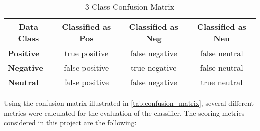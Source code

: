 \begin{table}[H]
\centering
\caption{3-Class Confusion Matrix}
\label{tab:confusion_matrix}
\begin{tabular}{|l|c|c|c|}
\hline
\multicolumn{1}{|c|}{{\color[HTML]{000000} \textbf{Data Class}}} & {\color[HTML]{000000} \textbf{Classified as Pos}} & \textbf{Classified as Neg} & \textbf{Classified as Neu} \\ \hline
{\color[HTML]{000000} \textbf{Positive}}                         & {\color[HTML]{036400} true positive}              & false negative             & false neutral              \\ \hline
\textbf{Negative}                                                & false positive                                    & {\color[HTML]{036400} true negative}              & false neutral              \\ \hline
\textbf{Neutral}                                                 & false positive                                    & false negative             & {\color[HTML]{036400} true neutral}               \\ \hline
\end{tabular}
\end{table}

Using the confusion matrix illustrated in \autoref{tab:confusion_matrix}, several different metrics were calculated for the evaluation of the classifier. The scoring metrics considered in this project are the following:

